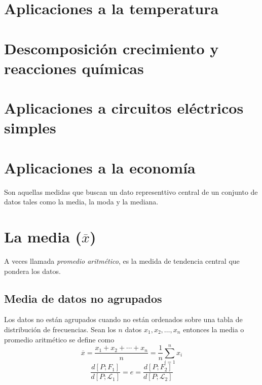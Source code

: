 \documentclass[10pt,]{krantz}
\theoremstyle{definition}
\theoremstyle{definition}
\theoremstyle{definition}
\theoremstyle{remark}
\begin{document}
\hypertarget{aplicaciones-a-la-temperatura}{%
\section{Aplicaciones a la temperatura}\label{aplicaciones-a-la-temperatura}}

\hypertarget{descomposiciuxf3n-crecimiento-y-reacciones-quuxedmicas}{%
\section{Descomposición crecimiento y reacciones químicas}\label{descomposiciuxf3n-crecimiento-y-reacciones-quuxedmicas}}

\hypertarget{aplicaciones-a-circuitos-eluxe9ctricos-simples}{%
\section{Aplicaciones a circuitos eléctricos simples}\label{aplicaciones-a-circuitos-eluxe9ctricos-simples}}

\hypertarget{aplicaciones-a-la-economuxeda}{%
\section{Aplicaciones a la economía}\label{aplicaciones-a-la-economuxeda}}

Son aquellas medidas que buscan un dato representtivo central de un conjunto de datos tales como la media, la moda y la mediana.

\hypertarget{la-media-overlinex}{%
\section{\texorpdfstring{La media (\(\overline{x}\))}{La media (\textbackslash{}overline\{x\})}}\label{la-media-overlinex}}

A veces llamada \emph{promedio aritmético}, es la medida de tendencia central que pondera los datos.

\hypertarget{media-de-datos-no-agrupados}{%
\subsection{Media de datos no agrupados}\label{media-de-datos-no-agrupados}}

Los datos no están agrupados cuando no están ordenados sobre una tabla de distribución de frecuencias. Sean los \(n\) datos \(x_1, x_2,\ldots, x_n\) entonces la media o promedio aritmético se define como
\begin{equation}
\overline{x}=\frac{x_1+x_2+\cdots+x_n}{n}=\frac{1}{n}\sum_{i=1}^nx_i
\label{eq:w1}
\end{equation}
\begin{equation}
\frac{d\left[P;F_1\right]}{d\left[P;\mathcal{L}_1\right]}=e=\frac{d\left[P;F_2\right]}{d\left[P;\mathcal{L}_2\right]}
\label{eq:ww}
\end{equation}
\end{document}
